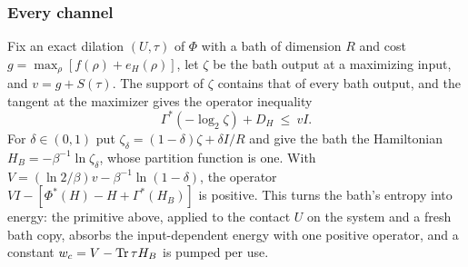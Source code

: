 \subsubsection{Every channel}

Fix an exact dilation $(U,\tau)$ of $\Phi$ with a bath of dimension $R$ and cost $g=\max_\rho[f(\rho)+e_H(\rho)]$, let $\zeta$ be the bath output at a maximizing input, and $v=g+S(\tau)$. The support of $\zeta$ contains that of every bath output, and the tangent at the maximizer gives the operator inequality
\[
\Gamma^*(-\log_2\zeta)+D_H\ \le\ vI.
\]
For $\delta\in(0,1)$ put $\zeta_\delta=(1-\delta)\zeta+\delta I/R$ and give the bath the Hamiltonian $H_B=-\beta^{-1}\ln\zeta_\delta$, whose partition function is one. With $V=(\ln2/\beta)v-\beta^{-1}\ln(1-\delta)$, the operator $VI-[\Phi^*(H)-H+\Gamma^*(H_B)]$ is positive. This turns the bath's entropy into energy: the primitive above, applied to the contact $U$ on the system and a fresh bath copy, absorbs the input-dependent energy with one positive operator, and a constant $w_c=V-\operatorname{Tr}\tau H_B$ is pumped per use.

